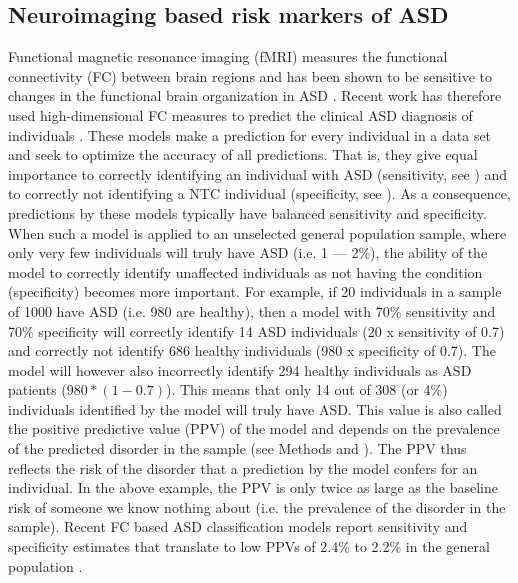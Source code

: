 \documentclass[9pt,lineno]{elife}
\begin{document}
\subsection{Neuroimaging based risk markers of ASD}
Functional magnetic resonance imaging (fMRI) measures the functional connectivity (FC) between brain regions and has been shown to be sensitive to changes in the functional brain organization in ASD \citep{Castellanos2013-tw,Holiga2019-ub}. Recent work has therefore used high-dimensional FC measures to predict the clinical ASD diagnosis of individuals \citep{Abraham2017-vf,Heinsfeld2018-yl,Yahata2016-jk}. These models make a prediction for every individual in a data set and seek to optimize the accuracy of all predictions. That is, they give equal importance to correctly identifying an individual with ASD (sensitivity, see ) and to correctly not identifying a NTC individual (specificity, see ). As a consequence, predictions by these models typically have balanced sensitivity and specificity. When such a model is applied to an unselected general population sample, where only very few individuals will truly have ASD (i.e. 1 --- 2\%), the ability of the model to correctly identify unaffected individuals as not having the condition (specificity) becomes more important. For example, if 20 individuals in a sample of 1000 have ASD (i.e. 980 are healthy), then a model with 70\% sensitivity and 70\% specificity will correctly identify 14 ASD individuals (20 x sensitivity of 0.7) and correctly not identify 686 healthy individuals (980 x specificity of 0.7). The model will however also incorrectly identify 294 healthy individuals as ASD patients ($980 * (1 - 0.7)$). This means that only 14 out of 308 (or 4\%) individuals identified by the model will truly have ASD. This value is also called the positive predictive value (PPV) of the model and depends on the prevalence of the predicted disorder in the sample (see Methods and ). The PPV thus reflects the risk of the disorder that a prediction by the model confers for an individual. In the above example, the PPV is only twice as large as the baseline risk of someone we know nothing about (i.e. the prevalence of the disorder in the sample). Recent FC based ASD classification models report sensitivity and specificity estimates that translate to low PPVs of 2.4\% to 2.2\% in the general population \citep{Abraham2017-vf,Heinsfeld2018-yl}.
\end{document}
